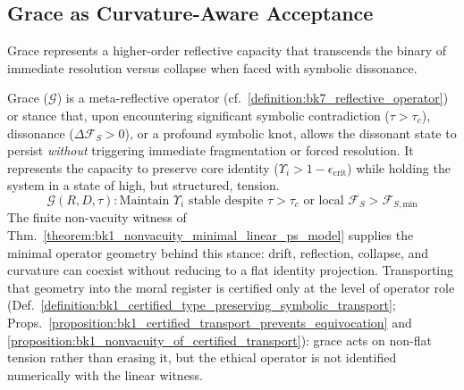 \subsection{Grace as Curvature-Aware Acceptance}
\label{subsec:bk9_grace_as_curvature_aware_acceptance}
Grace represents a higher-order reflective capacity that transcends the binary of immediate resolution versus collapse when faced with symbolic dissonance.
\begin{definition}
\label{definition:bk9_grace_operator}
Grace ($\mathcal{G}$) is a meta-reflective operator (cf.~\ref{definition:bk7_reflective_operator}) or stance that, upon encountering significant symbolic contradiction ($\tau > \tau_c$), dissonance ($\Delta \mathcal{F}_S > 0$), or a profound symbolic knot, allows the dissonant state to persist \emph{without} triggering immediate fragmentation or forced resolution. It represents the capacity to preserve core identity ($\Upsilon_i > 1 - \epsilon_{\text{crit}}$) while holding the system in a state of high, but structured, tension.
\[
\mathcal{G}(R, D, \tau): \text{Maintain } \Upsilon_i \text{ stable despite } \tau > \tau_c \text{ or local } \mathcal{F}_S > \mathcal{F}_{S, \text{min}}
\]
The finite non-vacuity witness of Thm.~\ref{theorem:bk1_nonvacuity_minimal_linear_ps_model} supplies the minimal operator geometry behind this stance: drift, reflection, collapse, and curvature can coexist without reducing to a flat identity projection.  Transporting that geometry into the moral register is certified only at the level of operator role (Def.~\ref{definition:bk1_certified_type_preserving_symbolic_transport}; Props.~\ref{proposition:bk1_certified_transport_prevents_equivocation} and \ref{proposition:bk1_nonvacuity_of_certified_transport}): grace acts on non-flat tension rather than erasing it, but the ethical operator is not identified numerically with the linear witness.
\end{definition}
